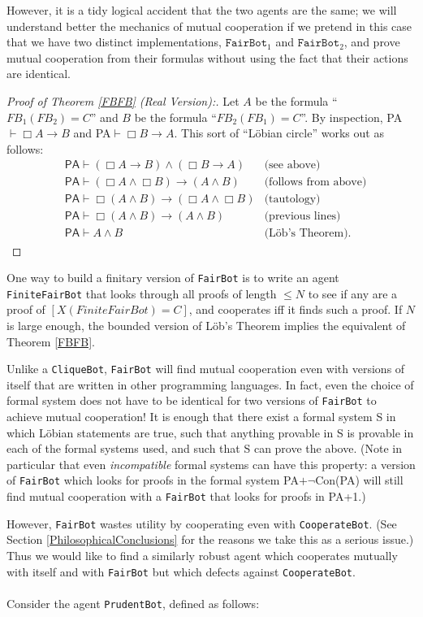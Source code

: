 \documentclass[12pt, letterpaper]{article}
\numberwithin{equation}{section}
\newenvironment{remark}[1][Remark]{\begin{trivlist}
\item[\hskip \labelsep {\bfseries #1}]}{\end{trivlist}}
\begin{document}
However, it is a tidy logical accident that the two agents are the same; we will understand better the mechanics of mutual cooperation if we pretend in this case that we have two distinct implementations, $\texttt{FairBot}_1$ and $\texttt{FairBot}_2$, and prove mutual cooperation from their formulas without using the fact that their actions are identical.
\begin{proof}[Proof of Theorem \ref{FBFB} (Real Version):]
Let $A$ be the formula ``$FB_1(FB_2)=C$'' and $B$ be the formula ``$FB_2(FB_1)=C$''. By inspection, \textsf{PA}$\vdash \Box A \to B$ and \textsf{PA}$\vdash \Box B \to A$. This sort of ``L\"{o}bian circle'' works out as follows:
\begin{eqnarray*}
&\textsf{PA} \vdash (\Box A\to B)\wedge (\Box B \to A) & \text{(see above)}\\
&\textsf{PA} \vdash (\Box A\wedge \Box B)\to (A \wedge B) & \text{(follows from above)}\\
&\textsf{PA} \vdash \Box(A\wedge B)\to (\Box A \wedge \Box B) & \text{(tautology)}\\
&\textsf{PA} \vdash \Box(A \wedge B) \to (A \wedge B) & \text{(previous lines)}\\
&\textsf{PA} \vdash A\wedge B & \text{(L\"{o}b's Theorem).}
\end{eqnarray*}
\end{proof}
\begin{remark}
One way to build a finitary version of \texttt{FairBot} is to write an agent \texttt{FiniteFairBot} that looks through all proofs of length $\leq N$ to see if any are a proof of $[X(FiniteFairBot)=C]$, and cooperates iff it finds such a proof. If $N$ is large enough, the bounded version of L\"{o}b's Theorem implies the equivalent of Theorem \ref{FBFB}.
\end{remark}
\begin{remark}
Unlike a \texttt{CliqueBot}, \texttt{FairBot} will find mutual cooperation even with versions of itself that are written in other programming languages. In fact, even the choice of formal system does not have to be identical for two versions of \texttt{FairBot} to achieve mutual cooperation! It is enough that there exist a formal system \textsf{S} in which L\"{o}bian statements are true, such that anything provable in \textsf{S} is provable in each of the formal systems used, and such that \textsf{S} can prove the above. (Note in particular that even \emph{incompatible} formal systems can have this property: a version of \texttt{FairBot} which looks for proofs in the formal system \textsf{PA}$+\neg$\textsf{Con(PA)} will still find mutual cooperation with a \texttt{FairBot} that looks for proofs in \textsf{PA+1}.)
\end{remark}
However, \texttt{FairBot} wastes utility by cooperating even with \texttt{CooperateBot}. (See Section \ref{PhilosophicalConclusions} for the reasons we take this as a serious issue.) Thus we would like to find a similarly robust agent which cooperates mutually with itself and with \texttt{FairBot} but which defects against \texttt{CooperateBot}.\\
\\
Consider the agent \texttt{PrudentBot}, defined as follows:
\end{document}
